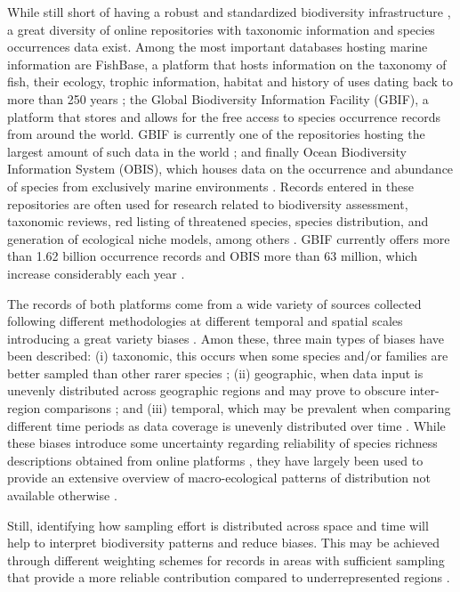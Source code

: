 \documentclass[12pt,authoryear]{elsarticle}
\begin{document}
While still short of having a robust and standardized biodiversity infrastructure \citep{heberling_data_2021}, a great diversity of online repositories with taxonomic information and species occurrences data exist. Among the most important databases hosting marine information are FishBase, a platform that hosts information on the taxonomy of fish, their ecology, trophic information, habitat and history of uses dating back to more than 250 years \citep{froese2000fishbase}; the Global Biodiversity Information Facility (GBIF), a platform that stores and allows for the free access to species occurrence records from around the world. GBIF is currently one of the repositories hosting the largest amount of such data in the world \citep{telenius2011, gbif}; and finally Ocean Biodiversity Information System (OBIS), which houses data on the occurrence and abundance of species from exclusively marine environments \citep{obis}. Records entered in these repositories are often used for research related to biodiversity assessment, taxonomic reviews, red listing of threatened species, species distribution, and generation of ecological niche models, among others \citep{yesson2007}. GBIF currently offers more than 1.62 billion occurrence records and OBIS more than 63 million, which increase considerably each year \citep{gbif, obis}.

The records of both platforms come from a wide variety of sources collected following different methodologies at different temporal and spatial scales introducing a great variety  biases \citep{beck2014, zizka2020}. Amon these, three main types of biases have been described: (i) taxonomic, this occurs when some species and/or families are better sampled than other rarer species \citep{chandler2017}; (ii) geographic, when data input is unevenly distributed across geographic regions and may prove to obscure inter-region comparisons \citep{yang2013geographical, yesson2007}; and (iii) temporal, which may be prevalent when comparing different time periods as data coverage is unevenly distributed over time \citep{chandler2017, yang2013geographical}. While these biases introduce some uncertainty regarding reliability of species richness descriptions obtained from online platforms \citep{beck2014, garcia2015}, they have largely been used to provide an extensive overview of macro-ecological patterns of distribution not available otherwise \citep{mora2008completeness,troia2017}. 

Still, identifying how sampling effort is distributed across space and time will help to interpret biodiversity patterns and reduce biases. This may be achieved through different weighting schemes for records in areas with sufficient sampling that provide a more reliable contribution compared to underrepresented regions \citep{phillips2009, hortal2008, yang2013geographical}. 
\end{document}
